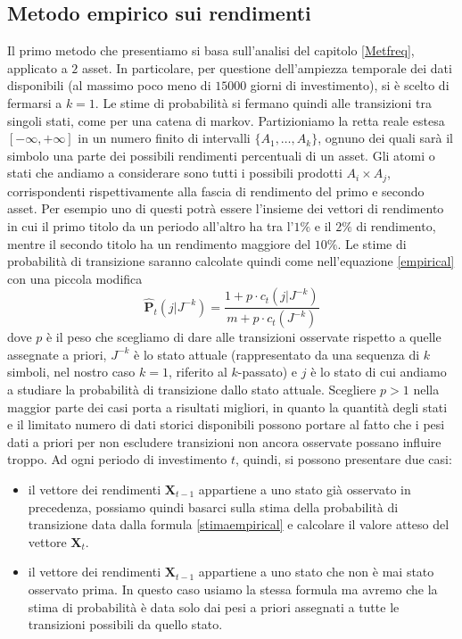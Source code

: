 \documentclass[a4paper,11pt]{book}
\theoremstyle{plain}
\theoremstyle{definition}
\theoremstyle{remark}
\newcommand{\X}{\bm{X}}
\newcommand{\Ph}{\hat{\mathbf{P}}}
\begin{document}
\subsection{Metodo empirico sui rendimenti}\label{emprend}
Il primo metodo che presentiamo si basa sull'analisi del capitolo \ref{Metfreq}, applicato a $2$ asset. In particolare, per questione dell'ampiezza temporale dei dati disponibili (al massimo poco meno di $15000$ giorni di investimento), si è scelto di fermarsi a $k=1$. Le stime di probabilità si fermano quindi alle transizioni tra singoli stati, come per una catena di markov.\newline
Partizioniamo la retta reale estesa $[-\infty,+\infty]$ in un numero finito di intervalli $\{A_1,\ldots, A_k\}$, ognuno dei quali sarà il simbolo una parte dei possibili rendimenti percentuali di un asset. Gli atomi o stati che andiamo a considerare sono tutti i possibili prodotti $A_i\times A_j$, corrispondenti rispettivamente alla fascia di rendimento del primo e secondo asset. Per esempio uno di questi potrà essere l'insieme dei vettori di rendimento in cui il primo titolo da un periodo all'altro ha tra l'$1\%$ e il $2\%$ di rendimento, mentre il secondo titolo ha un rendimento maggiore del $10\%$. Le stime di probabilità di transizione saranno calcolate quindi come nell'equazione \ref{empirical} con una piccola modifica
\begin{equation}\label{stimaempirical}
	\Ph_t(j|J^{-k})=\frac{1+p\cdot c_t(j|J^{-k})}{m+p\cdot c_t(J^{-k})}
\end{equation}
dove $p$ è il peso che scegliamo di dare alle transizioni osservate rispetto a quelle assegnate a priori, $J^{-k}$ è lo stato attuale (rappresentato da una sequenza di $k$ simboli, nel nostro caso $k=1$, riferito al $k$-passato) e $j$ è lo stato di cui andiamo a studiare la probabilità di transizione dallo stato attuale. Scegliere $p>1$ nella maggior parte dei casi porta a risultati migliori, in quanto la quantità degli stati e il limitato numero di dati storici disponibili possono portare al fatto che i pesi dati a priori per non escludere transizioni non ancora osservate possano influire troppo.\newline
Ad ogni periodo di investimento $t$, quindi, si possono presentare due casi:
\begin{itemize}
	\item il vettore dei rendimenti $\X_{t-1}$ appartiene a uno stato già osservato in precedenza, possiamo quindi basarci sulla stima  della probabilità di transizione data dalla formula \ref{stimaempirical} e calcolare il valore atteso del vettore $\X_t$.
	\item il vettore dei rendimenti $\X_{t-1}$ appartiene a uno stato che non è mai stato osservato prima. In questo caso usiamo la stessa formula ma avremo che la stima di probabilità è data solo dai pesi a priori assegnati a tutte le transizioni possibili da quello stato.
\end{itemize}
\end{document}
